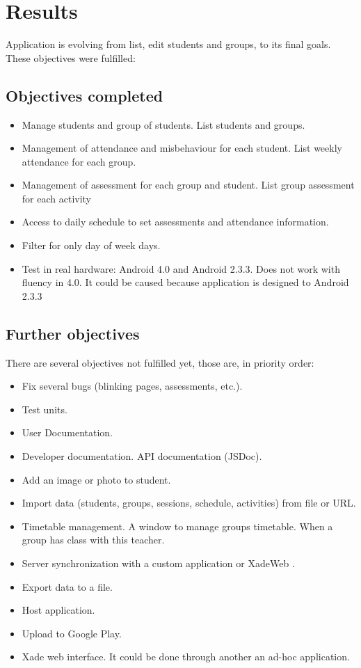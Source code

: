 \chapter{Results}

Application is evolving from list, edit students and groups, to its final goals. These objectives were fulfilled:
\section{Objectives completed}
\begin{itemize}
  \item Manage students and group of students. 
  \subitem List students and groups.
  \item Management of attendance and misbehaviour for each student. 
  \subitem List weekly attendance for each group.
  \item Management of assessment for each group and student. 
  \subitem List group assessment for each activity  
  \item Access to daily schedule to set assessments and attendance information.  
  \item Filter for only day of week days. 
  \item Test in real hardware: Android 4.0 and Android 2.3.3. Does not work with fluency in 4.0. It could be 
  caused because application is designed to Android 2.3.3
\end{itemize}




\section{Further objectives}

There are several objectives not fulfilled yet, those are, in priority order:
\begin{itemize}
\item Fix several bugs (blinking pages, assessments, etc.).
\item Test units. 
\item User Documentation.
\item Developer documentation. API documentation (JSDoc).
\item Add an image or photo to student.
\item Import data (students, groups, sessions, schedule, activities) from file or URL.
\item Timetable management. A window to manage groups timetable. When a group has class with this teacher.
\item Server synchronization with a custom application or XadeWeb \cite{Xade}.
\item Export data to a file.
\item Host application.
\item Upload to Google Play.
\item Xade web interface. It could be done through another an ad-hoc application.
\end{itemize}

